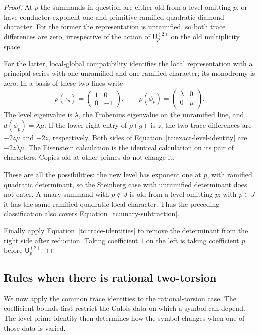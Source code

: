 \begin{proof}
At $p$ the summands in question are either old from a level omitting
$p$, or have conductor exponent one and primitive ramified quadratic
diamond character.  For the former the representation is unramified,
so both trace differences are zero, irrespective of the action of
$\mathsf U_p^{(2)}$ on the old multiplicity space.

For the latter, local-global compatibility identifies the local
representation with a principal series with one unramified and one
ramified character; its monodromy is zero.  In a basis of these two
lines write
\[
 \rho(\tau_p)=\begin{pmatrix}1&0\\0&-1\end{pmatrix},
 \qquad
 \rho(\phi_p)=\begin{pmatrix}\lambda&0\\0&\mu\end{pmatrix}.
\]
The level eigenvalue is $\lambda$, the Frobenius eigenvalue on the
unramified line, and $d(\phi_p)=\lambda\mu$.  If the lower-right entry
of $\rho(g)$ is $z$, the two trace differences are $-2z\mu$ and
$-2z$, respectively.  Both sides of
Equation~\eqref{tc:exact-level-identity} are $-2z\lambda\mu$.
The Eisenstein calculation is the identical calculation on its pair
of characters.  Copies old at other primes do not change it.

These are all the possibilities: the new level has exponent one at
$p$, with ramified quadratic determinant, so the Steinberg case with
unramified determinant does not enter.  A unary summand with $p\notin J$
is old from a level omitting $p$; with $p\in J$ it has the same ramified
quadratic local character.  Thus the preceding classification also
covers Equation~\eqref{tc:unary-subtraction}.

Finally apply Equation~\eqref{tc:trace-identities} to remove the
determinant from the right side after reduction.  Taking coefficient
$1$ on the left is taking coefficient $p$ before $\mathsf U_p^{(2)}$.
\end{proof}

\subsection{Rules when there is rational two-torsion}

We now apply the common trace identities to the rational-torsion case.
The coefficient bounds first restrict the Galois data on which a symbol
can depend. The level-prime identity then determines how the symbol
changes when one of those data is varied.

